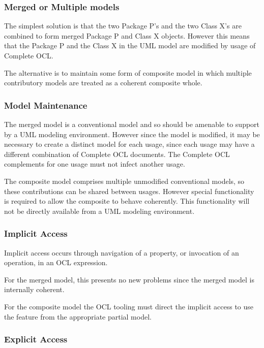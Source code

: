 \documentclass{eceasst}
\begin{document}
\subsubsection{Merged or Multiple models}

The simplest solution is that the two Package P's and the two Class X's are combined to form merged Package P and  Class X objects. However this means that the Package P and the Class X in the UML model are modified by usage of Complete OCL.

The alternative is to maintain some form of composite model in which multiple contributory models are treated as a coherent composite whole.

\subsubsection{Model Maintenance}

The merged model is a conventional model and so should be amenable to support by a UML modeling environment. However since the model is modified, it may be necessary to create a distinct model for each usage, since each usage may have a different combination of Complete OCL documents. The Complete OCL complements for one usage must not infect another usage.

The composite model comprises multiple unmodified conventional models, so these contributions can be shared between usages. However special functionality is required to allow the composite to behave coherently. This functionality will not be directly available from a UML modeling environment.

\subsubsection{Implicit Access}

Implicit access occurs through navigation of a property, or invocation of an operation, in an OCL expression.

For the merged model, this presents no new problems since the merged model is internally coherent.

For the composite model the OCL tooling must direct the implicit access to use the feature from the appropriate partial model.

\subsubsection{Explicit Access}
\end{document}
